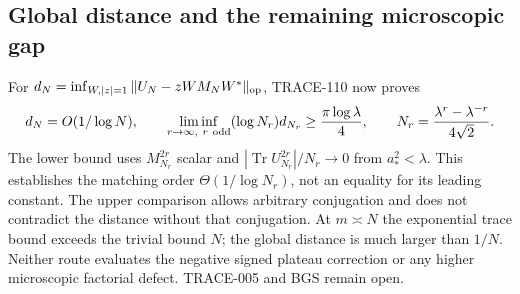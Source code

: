 \subsection{Global distance and the remaining microscopic gap}
For $d_N=\inf_{W,|z|=1}\|U_N-zWM_NW^*\|_{\rm op}$,
TRACE-110 now proves
\[
d_N=O(1/\log N),\qquad
\liminf_{r\to\infty,\ r\ {\rm odd}}(\log N_r)d_{N_r}
\ge\frac{\pi\log\lambda}{4},\qquad
N_r=\frac{\lambda^r-\lambda^{-r}}{4\sqrt2}.
\]
The lower bound uses $M_{N_r}^{2r}$ scalar and
$|\operatorname{Tr}U_{N_r}^{2r}|/N_r\to0$ from $a_*^2<\lambda$.
This establishes the matching order $\Theta(1/\log N_r)$, not an equality
for its leading constant. The upper comparison allows arbitrary conjugation
and does not contradict the distance without that conjugation.
At $m\asymp N$ the exponential trace bound exceeds the trivial bound $N$;
the global distance is much larger than $1/N$. Neither route evaluates
the negative signed plateau correction or any higher microscopic factorial
defect. TRACE-005 and BGS remain open.
